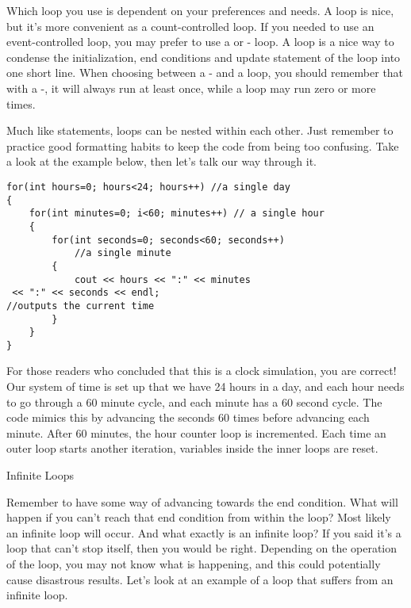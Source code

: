 
Which loop you use is dependent on your preferences and needs.
A  loop is nice, but it’s more convenient as a count-controlled loop.
If you needed to use an event-controlled loop, you may prefer to use a  or - loop.
A  loop is a nice way to condense the initialization, end conditions and update statement of the loop into one short line.
When choosing between a - and a  loop, you should remember that with a -, it will always run at least once, while a  loop may run zero or more times.


Much like  statements, loops can be nested within each other.
Just remember to practice good formatting habits to keep the code from being too confusing.
Take a look at the example below, then let’s talk our way through it.


\begin{lstlisting}
for(int hours=0; hours<24; hours++)	//a single day
{
	for(int minutes=0; i<60; minutes++)	// a single hour
	{
		for(int seconds=0; seconds<60; seconds++)
			//a single minute
		{
			cout << hours << ":" << minutes
 << ":" << seconds << endl;
//outputs the current time
		}
	}
}
\end{lstlisting}

For those readers who concluded that this is a clock simulation, you are correct!
Our system of time is set up that we have 24 hours in a day, and each hour needs to go through a 60 minute cycle, and each minute has a 60 second cycle.
The code mimics this by advancing the seconds 60 times before advancing each minute.
After 60 minutes, the hour counter loop is incremented. Each time an outer loop starts another iteration, variables inside the inner loops are reset.

Infinite Loops

Remember to have some way of advancing towards the end condition.
What will happen if you can’t reach that end condition from within the loop?
Most likely an infinite loop will occur. And what exactly is an infinite loop?
If you said it’s a loop that can’t stop itself, then you would be right.
Depending on the operation of the loop, you may not know what is happening, and this could potentially cause disastrous results.
Let's look at an example of a  loop that suffers from an infinite loop.

